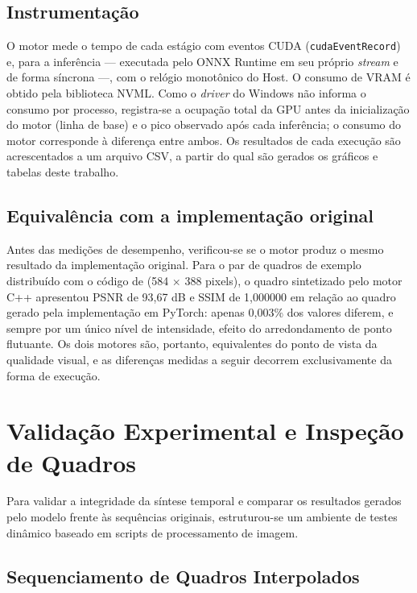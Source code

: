 \documentclass[
    12pt,                %
    openright,           %
    oneside,             %
    a4paper,             %
    english,             %
    brazil               %
]{abntex2}
\begin{document}
\subsection{Instrumentação}

O motor mede o tempo de cada estágio com eventos CUDA (\texttt{cudaEventRecord}) e, para a inferência --- executada pelo ONNX Runtime em seu próprio \textit{stream} e de forma síncrona ---, com o relógio monotônico do Host. O consumo de VRAM é obtido pela biblioteca NVML. Como o \textit{driver} do Windows não informa o consumo por processo, registra-se a ocupação total da GPU antes da inicialização do motor (linha de base) e o pico observado após cada inferência; o consumo do motor corresponde à diferença entre ambos. Os resultados de cada execução são acrescentados a um arquivo CSV, a partir do qual são gerados os gráficos e tabelas deste trabalho.

\subsection{Equivalência com a implementação original}

Antes das medições de desempenho, verificou-se se o motor produz o mesmo resultado da implementação original. Para o par de quadros de exemplo distribuído com o código de  (584 $\times$ 388 pixels), o quadro sintetizado pelo motor C++ apresentou PSNR de 93,67 dB e SSIM de 1,000000 em relação ao quadro gerado pela implementação em PyTorch: apenas 0,003\% dos valores diferem, e sempre por um único nível de intensidade, efeito do arredondamento de ponto flutuante. Os dois motores são, portanto, equivalentes do ponto de vista da qualidade visual, e as diferenças medidas a seguir decorrem exclusivamente da forma de execução.

\section{Validação Experimental e Inspeção de Quadros}
\label{sec:validacao_experimental}

Para validar a integridade da síntese temporal e comparar os resultados gerados pelo modelo frente às sequências originais, estruturou-se um ambiente de testes dinâmico baseado em scripts de processamento de imagem.

\subsection{Sequenciamento de Quadros Interpolados}
\end{document}
